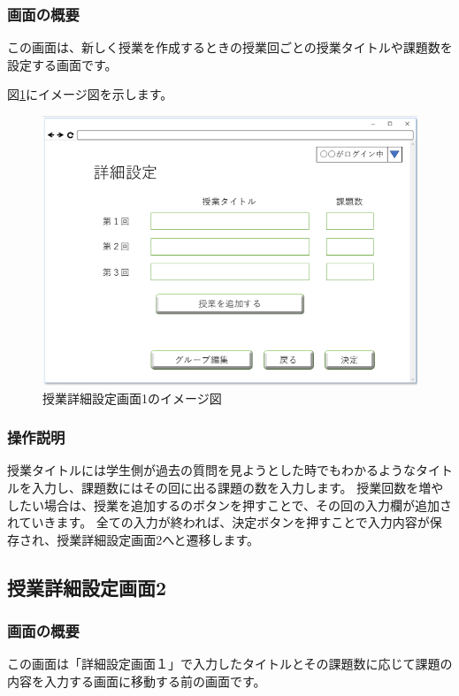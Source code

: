 \subsubsection{画面の概要}
この画面は、新しく授業を作成するときの授業回ごとの授業タイトルや課題数を設定する画面です。

図\ref{fig:11}にイメージ図を示します。

\begin{figure}[htbp]
\begin{center}
  \includegraphics[width=1\linewidth,clip]{./img/11.png}
  \caption{授業詳細設定画面1のイメージ図}\label{fig:11}
\end{center}
\end{figure}

\subsubsection{操作説明}
授業タイトルには学生側が過去の質問を見ようとした時でもわかるようなタイトルを入力し、課題数にはその回に出る課題の数を入力します。
授業回数を増やしたい場合は、授業を追加するのボタンを押すことで、その回の入力欄が追加されていきます。
全ての入力が終われば、決定ボタンを押すことで入力内容が保存され、授業詳細設定画面2へと遷移します。


\newpage

\subsection{授業詳細設定画面2}
\subsubsection{画面の概要}
この画面は「詳細設定画面１」で入力したタイトルとその課題数に応じて課題の内容を入力する画面に移動する前の画面です。

